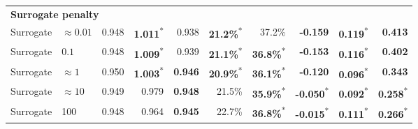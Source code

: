 \documentclass[10pt]{article}
\theoremstyle{definition}
\newcommand{\1}{\mathbf{1}}
\newcommand{\latesttext}[1]{\textcolor{latestPurple}{#1}}
\begin{document}
\begin{table}[!htbp]
{\begin{tabular}{llrrrrrrrr}
\multicolumn{10}{l}{\textbf{Surrogate penalty}} \\
\cmidrule(lr){1-10}
\latesttext{Surrogate} & \latesttext{$\approx0.01$} & \latesttext{0.948} & \latesttext{\textbf{1.011}\textsuperscript{*}} & \latesttext{0.938} & \latesttext{\textbf{21.2\%}\textsuperscript{*}} & \latesttext{37.2\%} & \latesttext{\textbf{-0.159}} & \latesttext{\textbf{0.119}\textsuperscript{*}} & \latesttext{\textbf{0.413}} \\
Surrogate & \latesttext{$0.1$} & \latesttext{0.948} & \latesttext{\textbf{1.009}\textsuperscript{*}} & \latesttext{0.939} & \latesttext{\textbf{21.1\%}\textsuperscript{*}} & \latesttext{\textbf{36.8\%}\textsuperscript{*}} & \textbf{-0.153} & \textbf{0.116}\textsuperscript{*} & \textbf{0.402} \\
Surrogate & \latesttext{$\approx1$} & \latesttext{0.950} & \latesttext{\textbf{1.003}\textsuperscript{*}} & \latesttext{\textbf{0.946}} & \latesttext{\textbf{20.9\%}\textsuperscript{*}} & \latesttext{\textbf{36.1\%}\textsuperscript{*}} & \textbf{-0.120} & \textbf{0.096}\textsuperscript{*} & \textbf{0.343} \\
Surrogate & \latesttext{$\approx10$} & \latesttext{0.949} & \latesttext{0.979} & \latesttext{\textbf{0.948}} & \latesttext{21.5\%} & \latesttext{\textbf{35.9\%}\textsuperscript{*}} & \textbf{-0.050}\textsuperscript{*} & \textbf{0.092}\textsuperscript{*} & \textbf{0.258}\textsuperscript{*} \\
Surrogate & 100 & \latesttext{0.948} & \latesttext{0.964} & \latesttext{\textbf{0.945}} & \latesttext{22.7\%} & \latesttext{\textbf{36.8\%}\textsuperscript{*}} & \textbf{-0.015}\textsuperscript{*} & \textbf{0.111}\textsuperscript{*} & \textbf{0.266}\textsuperscript{*} \\

\bottomrule
\end{tabular}}


\end{table}
\end{document}
